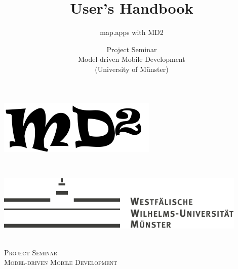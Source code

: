 \documentclass[a4paper, 12pt, titlepage, headsepline, listof = totoc, bibliography = totoc, numbers = noenddot]{scrbook} %
\title{User's Handbook}
\subtitle{map.apps with MD2}
\author{Project Seminar\\
Model-driven Mobile Development\\
(University of Münster)}
\begin{document}
\thispagestyle{empty}
\begin{titlepage}

\newcommand{\HRule}{\rule{\linewidth}{0.5mm}} %

\center %
 

\begin{minipage}[b]{0.4\textwidth}
\begin{flushleft}
\includegraphics{Fig/md2-logo}
\end{flushleft}
\end{minipage}
~
\begin{minipage}[b]{0.4\textwidth}
\begin{flushright}
\includegraphics[width=0.9\textwidth]{Fig/wwu-logo-title}
\end{flushright}
\end{minipage}\\[4cm] 
 
 
 

\textsc{\LARGE Project Seminar\\ Model-driven Mobile Development}\\[1.5cm] %


\end{titlepage}
\end{document}
